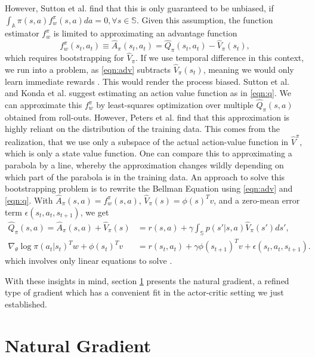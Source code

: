 \documentclass[final]{IEEEtran}
\begin{document}
However, Sutton et al. \cite{1993b} find that this is only guaranteed to be unbiased, if $\int_\mathbb{A}{\pi(s,a)f_w^\pi(s,a)da} = 0, \forall s \in \mathbb{S}$. 
Given this assumption, the function estimator $f_w^\pi$ is limited to approximating an advantage function
\begin{equation}
	f_w^\pi(s_t, a_t) \equiv \hat{A}_{\pi}(s_t, a_t) = \hat{Q}_{\pi}(s_t, a_t) - \hat{V}_{\pi}(s_t),
	\label{eqn:adv}
\end{equation} 
which requires bootstrapping for $\hat{V}_\pi$. 
If we use temporal difference in this context, we run into a problem, as \eqref{eqn:adv} subtracts $\hat{V}_\pi(s_t)$, meaning we would only learn immediate rewards \cite{Peters_IICHR_2003}. 
This would render the process biased. 
Sutton et al. \cite{Sutton:1999:PGM:3009657.3009806} and Konda et al. \cite{NIPS1999_1786} suggest estimating an action value function as in \eqref{eqn:q}. 
We can approximate this $f_w^\pi$ by least-squares optimization over multiple $\hat{Q}_\pi(s,a)$ obtained from roll-outs. 
However, Peters et al. \cite{4863} find that this approximation is highly reliant on the distribution of the training data. 
This comes from the realization, that we use only a subspace of the actual action-value function in $\hat{V}^\pi$, which is only a state value function. 
One can compare this to approximating a parabola by a line, whereby the approximation changes wildly depending on which part of the parabola is in the training data. 
An approach to solve this bootstrapping problem is to rewrite the Bellman Equation using \eqref{eqn:adv} and \eqref{eqn:q}.
With $\hat{A}_\pi(s,a) = f_w^\pi(s,a)$, $\hat{V}_\pi(s) = \phi(s)^T v$, and a zero-mean error term $\epsilon(s_t,a_t,s_{t+1})$, we get
\begin{align}
  \hat{Q}_\pi(s,a) = \hat{A}_\pi(s,a) + \hat{V}_\pi(s) &= r(s,a) + \gamma \int_\mathbb{S} p(s'|s,a)\hat{V}_\pi(s')ds', \\
  \nabla_\theta \log \pi(a_t|s_t)^T w + \phi(s_t)^T v &= r(s_t,a_t) + \gamma \phi(s_{t+1})^T v + \epsilon(s_t,a_t,s_{t+1}).
\end{align}
which involves only linear equations to solve \cite{4863}.

With these insights in mind, section \ref{sec:natural} presents the natural gradient, a refined type of gradient which has a convenient fit in the actor-critic setting we just established.

\section{Natural Gradient}
\label{sec:natural}
\end{document}
